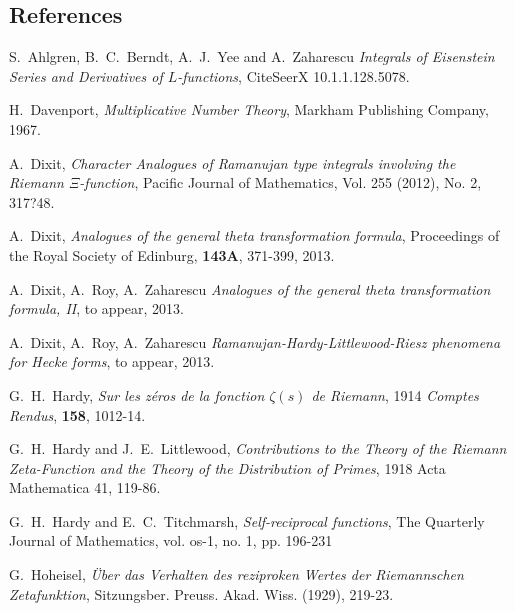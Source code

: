 \documentclass[11pt]{article}
\numberwithin{equation}{section}		 			%
\numberwithin{figure}{section}			 			%
\begin{document}
\subsection{References}
\begin{thebibliography}{99}

	 S.~Ahlgren, B.~C.~Berndt, A.~J.~Yee and A.~Zaharescu \emph{Integrals of Eisenstein Series and Derivatives of $L$-functions}, CiteSeerX 10.1.1.128.5078.
	
	
	
	 H.~Davenport, \emph{Multiplicative Number Theory}, Markham Publishing Company, 1967.
	
	 A.~Dixit, \emph{Character Analogues of Ramanujan type integrals involving the Riemann $\Xi$-function}, Pacific Journal of Mathematics, Vol. 255 (2012), No. 2, 317?48.
	
	 A.~Dixit, \emph{Analogues of the general theta transformation formula}, Proceedings of the Royal Society of Edinburg, \textbf{143A}, 371-399, 2013.
	
	 A.~Dixit, A.~Roy, A.~Zaharescu \emph{Analogues of the general theta transformation formula, II}, to appear, 2013.
	
	 A.~Dixit, A.~Roy, A.~Zaharescu \emph{Ramanujan-Hardy-Littlewood-Riesz phenomena for Hecke forms}, to appear, 2013.
	
	 G.~H.~Hardy, \emph{Sur les z\'eros de la fonction $\zeta(s)$ de Riemann}, 1914 \textit{Comptes Rendus}, \textbf{158}, 1012-14.
	
	 G.~H.~Hardy and J.~E.~Littlewood, \emph{Contributions to the Theory of the Riemann Zeta-Function and the Theory of the Distribution of Primes}, 1918 Acta Mathematica 41, 119-86.
	
	 G.~H.~Hardy and E.~C.~Titchmarsh, \emph{Self-reciprocal functions}, The Quarterly Journal of Mathematics, vol. os-1, no. 1, pp. 196-231
	
	 G.~Hoheisel, \emph{\"{U}ber das Verhalten des reziproken Wertes der Riemannschen Zetafunktion}, Sitzungsber. Preuss. Akad. Wiss. (1929), 219-23.
	

\end{thebibliography}
\end{document}
